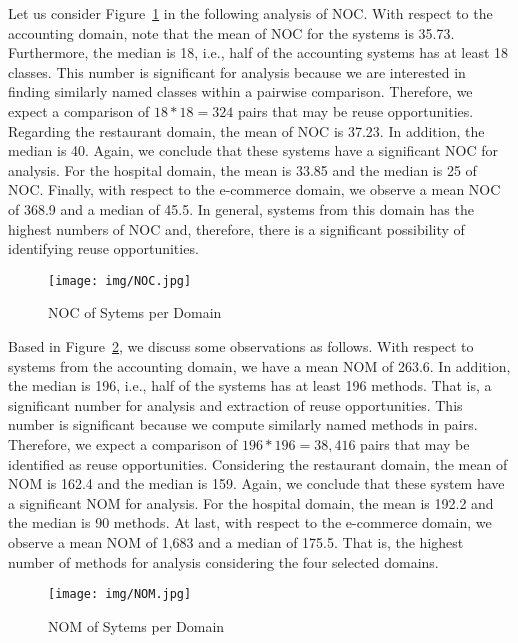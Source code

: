 Let us consider Figure~\ref{fig:noc} in the following analysis of NOC. With respect to the accounting domain, note that the mean of NOC for the systems is 35.73. Furthermore, the median is 18, i.e., half of the accounting systems has at least 18 classes. This number is significant for analysis because we are interested in finding  similarly named classes within a pairwise comparison. Therefore, we expect a comparison of $18 * 18 = 324$ pairs that may be reuse opportunities. Regarding the restaurant domain, the mean of NOC is 37.23. In addition, the median is 40. Again, we conclude that these systems have a significant NOC for analysis. For the hospital domain, the mean is 33.85 and the median is 25 of NOC. Finally, with respect to the e-commerce domain, we observe a mean NOC of 368.9 and a median of 45.5. In general, systems from this domain has the highest numbers of NOC and, therefore, there is a significant possibility of identifying reuse opportunities.

\begin{figure}[!h]%
\centering
\texttt{[image: img/NOC.jpg]}
\caption{NOC of Sytems per Domain}
\label{fig:noc}
\end{figure} 

Based in Figure~\ref{fig:nom}, we discuss some observations as follows. With respect to systems from the accounting domain, we have a mean NOM of 263.6. In addition, the median is 196, i.e., half of the systems has at least 196 methods. That is, a significant number for analysis and extraction of reuse opportunities. This number is significant because we compute similarly named methods in pairs. Therefore, we expect a comparison of $196 * 196 = 38,416$ pairs that may be identified as reuse opportunities. Considering the restaurant domain, the mean of NOM is 162.4 and the median is 159. Again, we conclude that these system have a significant NOM for analysis. For the hospital domain, the mean is 192.2 and the median is 90 methods. At last, with respect to the e-commerce domain, we observe a mean NOM of 1,683 and a median of 175.5. That is, the highest number of methods for analysis considering the four  selected domains.

\begin{figure}[!h]%
\centering
\texttt{[image: img/NOM.jpg]}
\caption{NOM of Sytems per Domain}
\label{fig:nom}
\end{figure} 





